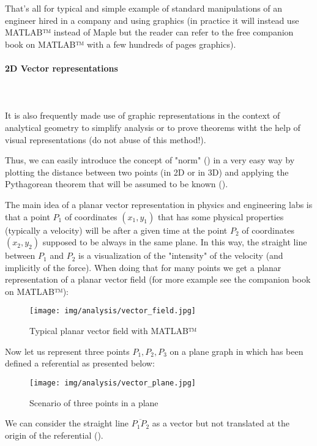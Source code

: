 That's all for typical and simple example of standard manipulations of an engineer hired in a company and using graphics (in practice it will instead use MATLAB™ instead of Maple but the reader can refer to the free companion book on MATLAB™ with a few hundreds of pages graphics).

\paragraph{2D Vector representations}\mbox{}\\\\
It is also frequently made use of graphic representations in the context of analytical geometry to simplify analysis or to prove theorems witht the help of visual representations (do not abuse of this method!).

Thus, we can easily introduce the concept of "norm" () in a very easy way by plotting the distance between two points (in 2D or in 3D) and applying the Pythagorean theorem that will be assumed to be known ().

The main idea of a planar vector representation in physics and engineering labs is that  a point $P_1$ of coordinates $(x_1,y_1)$ that has some physical properties (typically a velocity) will be after a given time at the point $P_2$ of coordinates $(x_2,y_2)$ supposed to be always in the same plane. In this way, the straight line between $P_1$ and $P_2$ is a visualization of the "intensity" of the velocity (and implicitly of the force). When doing that for many points we get a planar representation of a planar vector field (for more example see the companion book on MATLAB™):

\begin{figure}[H]
\centering
\texttt{[image: img/analysis/vector\_field.jpg]}
\caption[]{Typical planar vector field with MATLAB™}
\end{figure}


Now let us represent three points $P_1,P_2,P_3$ on a plane graph in which has been defined a referential as presented below:

\begin{figure}[H]
\centering
\texttt{[image: img/analysis/vector\_plane.jpg]}
\caption[]{Scenario of three points in a plane}
\end{figure}

We can consider the straight line $\overline{P_1P_2}$ as a vector but not translated at the origin of the referential ().

